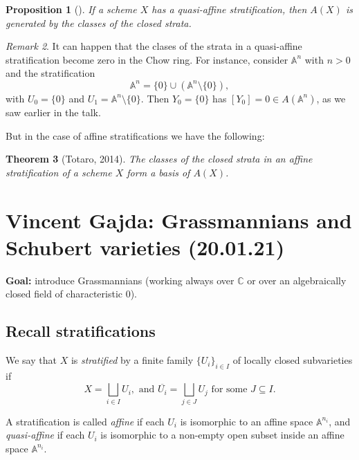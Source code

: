 \documentclass[12pt,a4paper]{amsart}
\theoremstyle{plain}
\newtheorem{thm}{Theorem}[section]
\newtheorem{prop}[thm]{Proposition}
\theoremstyle{definition}
\theoremstyle{remark}
\newtheorem{rem}[thm]{Remark}
\begin{document}
\begin{prop}[{\cite[Proposition 1.17]{eh16}}]
    If a scheme $X$ has a quasi-affine stratification, then $A(X)$ is generated by the classes of the closed strata.
\end{prop}

\begin{rem}
    It can happen that the clases of the strata in a quasi-affine stratification become zero in the Chow ring.
    For instance, consider $\mathbb{A}^{n}$ with $n>0$ and the stratification
    \[ \mathbb{A}^{n}=\{0\}\cup (\mathbb{A}^{n}\setminus \{ 0 \}), \]
    with $U_{0}=\{0\}$ and $U_{1}=\mathbb{A}^{n}\setminus \{0\}$.
    Then $Y_{0}=\{ 0\}$ has $[Y_{0}]=0\in A(\mathbb{A}^{n})$, as we saw earlier in the talk.
\end{rem}

But in the case of affine stratifications we have the following:

\begin{thm}[Totaro, 2014]
    The classes of the closed strata in an affine stratification of a scheme $X$ form a basis of $A(X)$.
\end{thm}

\section{Vincent Gajda: Grassmannians and Schubert varieties (20.01.21)}

\textbf{Goal:} introduce Grassmannians (working always over $\mathbb{C}$ or over an algebraically closed field of characteristic $0$).

\subsection{Recall stratifications}

We say that $X$ is \textit{stratified} by a finite family $\{U_{i}\}_{i\in I}$ of locally closed subvarieties if
\[ X=\bigsqcup_{i\in I}U_{i}, \text{ and } \overline{U_{i}}=\bigsqcup_{j\in J}U_{j} \text{ for some }J\subseteq I. \]

A stratification is called \textit{affine} if each $U_{i}$ is isomorphic to an affine space $\mathbb{A}^{n_{i}}$, and \textit{quasi-affine} if each $U_{i}$ is isomorphic to a non-empty open subset inside an affine space $\mathbb{A}^{n_{i}}$.
\end{document}
